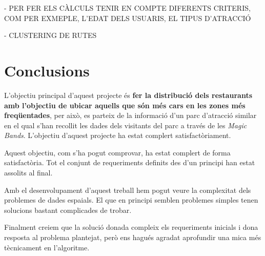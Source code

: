 \documentclass[12pt]{article}
\begin{document}
- PER FER ELS CÀLCULS TENIR EN COMPTE DIFERENTS CRITERIS, COM PER EXMEPLE, L'EDAT DELS USUARIS, EL TIPUS D'ATRACCIÓ

- CLUSTERING DE RUTES

\clearpage
\section{Conclusions}

L'objectiu principal d'aquest projecte és \textbf{fer la distribució dels restaurants amb l'objectiu de ubicar aquells que són més cars en les zones més freqüentades}, per això, es parteix de la informació d'un parc d'atracció similar en el qual s'han recollit les dades dels visitants del parc a través de les \textit{Magic Bands}. L'objectiu d'aquest projecte ha estat complert satisfactòriament. 

Aquest objectiu, com s’ha pogut comprovar, ha estat complert de forma satisfactòria. Tot el conjunt de requeriments definits des d’un principi han estat assolits al final.

Amb el desenvolupament d’aquest treball hem pogut veure la complexitat dels problemes de dades espaials. El que en principi semblen problemes simples tenen solucions bastant complicades de trobar.

Finalment creiem que la solució donada compleix els requeriments inicials i dona resposta al problema plantejat, però ens hagués agradat aprofundir una mica més tècnicament en l’algoritme.
\end{document}
